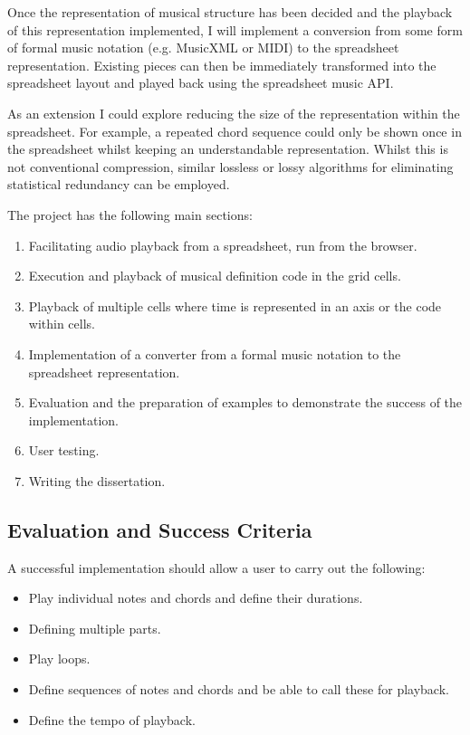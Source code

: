 \documentclass[]{article}
\begin{document}
Once the representation of musical structure has been decided and the
playback of this representation implemented, I will implement a
conversion from some form of formal music notation (e.g. MusicXML or
MIDI) to the spreadsheet representation. Existing pieces can then be
immediately transformed into the spreadsheet layout and played back
using the spreadsheet music API.

As an extension I could explore reducing the size of the representation
within the spreadsheet. For example, a repeated chord sequence could
only be shown once in the spreadsheet whilst keeping an understandable
representation. Whilst this is not conventional compression, similar
lossless or lossy algorithms for eliminating statistical redundancy can
be employed.

The project has the following main sections:

\begin{enumerate}
\def\labelenumi{\arabic{enumi}.}
\item
  Facilitating audio playback from a spreadsheet, run from the browser.
\item
  Execution and playback of musical definition code in the grid cells.
\item
  Playback of multiple cells where time is represented in an axis or the
  code within cells.
\item
  Implementation of a converter from a formal music notation to the
  spreadsheet representation.
\item
  Evaluation and the preparation of examples to demonstrate the success
  of the implementation.
\item
  User testing.
\item
  Writing the dissertation.
\end{enumerate}

\subsection{Evaluation and Success Criteria}\label{header-n37}

A successful implementation should allow a user to carry out the
following:

\begin{itemize}
\item
  Play individual notes and chords and define their durations.
\item
  Defining multiple parts.
\item
  Play loops.
\item
  Define sequences of notes and chords and be able to call these for
  playback.
\item
  Define the tempo of playback.
\end{itemize}
\end{document}
